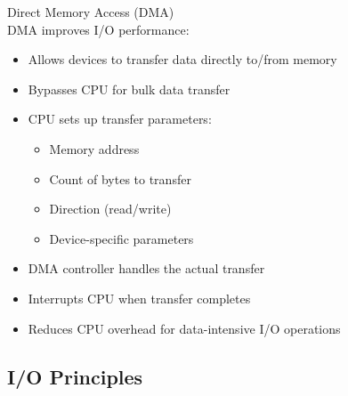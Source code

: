 \begin{definition}{Direct Memory Access (DMA)}\\
    DMA improves I/O performance:
    \begin{itemize}
        \item Allows devices to transfer data directly to/from memory
        \item Bypasses CPU for bulk data transfer
        \item CPU sets up transfer parameters:
            \begin{itemize}
                \item Memory address
                \item Count of bytes to transfer
                \item Direction (read/write)
                \item Device-specific parameters
            \end{itemize}
        \item DMA controller handles the actual transfer
        \item Interrupts CPU when transfer completes
        \item Reduces CPU overhead for data-intensive I/O operations
    \end{itemize}
\end{definition}

\subsection{I/O Principles}

